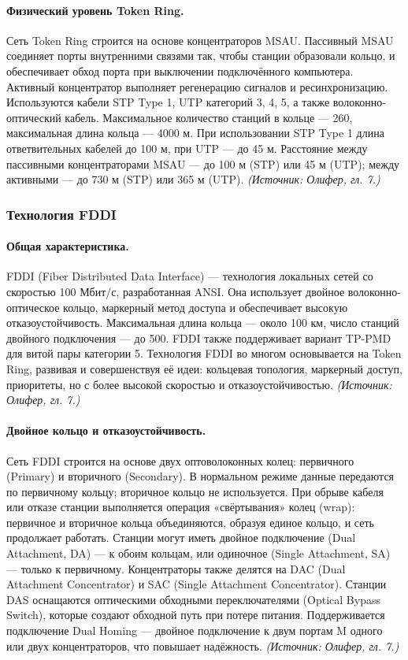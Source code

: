 \documentclass[a4paper,12pt]{article}
\begin{document}
\paragraph{Физический уровень Token Ring.}
Сеть Token Ring строится на основе концентраторов MSAU. Пассивный MSAU соединяет порты внутренними связями так, чтобы станции образовали кольцо, и обеспечивает обход порта при выключении подключённого компьютера. Активный концентратор выполняет регенерацию сигналов и ресинхронизацию. Используются кабели STP Type 1, UTP категорий 3, 4, 5, а также волоконно-оптический кабель. Максимальное количество станций в кольце — 260, максимальная длина кольца — 4000 м. При использовании STP Type 1 длина ответвительных кабелей до 100 м, при UTP — до 45 м. Расстояние между пассивными концентраторами MSAU — до 100 м (STP) или 45 м (UTP); между активными — до 730 м (STP) или 365 м (UTP).
\textit{(Источник: Олифер, гл. 7.)}

\subsubsection{Технология FDDI}

\paragraph{Общая характеристика.}
FDDI (Fiber Distributed Data Interface) — технология локальных сетей со скоростью 100 Мбит/с, разработанная ANSI. Она использует двойное волоконно-оптическое кольцо, маркерный метод доступа и обеспечивает высокую отказоустойчивость. Максимальная длина кольца — около 100 км, число станций двойного подключения — до 500. FDDI также поддерживает вариант TP-PMD для витой пары категории 5. Технология FDDI во многом основывается на Token Ring, развивая и совершенствуя её идеи: кольцевая топология, маркерный доступ, приоритеты, но с более высокой скоростью и отказоустойчивостью.
\textit{(Источник: Олифер, гл. 7.)}

\paragraph{Двойное кольцо и отказоустойчивость.}
Сеть FDDI строится на основе двух оптоволоконных колец: первичного (Primary) и вторичного (Secondary). В нормальном режиме данные передаются по первичному кольцу; вторичное кольцо не используется. При обрыве кабеля или отказе станции выполняется операция «свёртывания» колец (wrap): первичное и вторичное кольца объединяются, образуя единое кольцо, и сеть продолжает работать. Станции могут иметь двойное подключение (Dual Attachment, DA) — к обоим кольцам, или одиночное (Single Attachment, SA) — только к первичному. Концентраторы также делятся на DAC (Dual Attachment Concentrator) и SAC (Single Attachment Concentrator). Станции DAS оснащаются оптическими обходными переключателями (Optical Bypass Switch), которые создают обходной путь при потере питания. Поддерживается подключение Dual Homing — двойное подключение к двум портам M одного или двух концентраторов, что повышает надёжность.
\textit{(Источник: Олифер, гл. 7.)}
\end{document}
